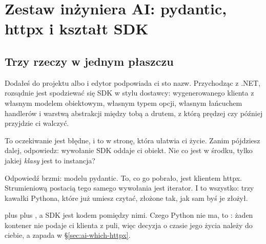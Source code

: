 
\chapter{Zestaw inżyniera AI: pydantic, httpx i kształt SDK}
\label{ch:aitoolkit}

\section{Trzy rzeczy w jednym płaszczu}
\label{sec:ai-three-things}

Dodałeś do projektu  albo  i edytor podpowiada ci
sto nazw. Przychodząc z .NET, rozsądnie jest spodziewać się SDK w stylu
dostawcy: wygenerowanego klienta z własnym modelem obiektowym, własnym typem
opcji, własnym łańcuchem handlerów i warstwą abstrakcji między tobą a
drutem, z którą prędzej czy później przyjdzie ci walczyć.

To oczekiwanie jest błędne, i to w stronę, która ułatwia ci życie. Zanim
pójdziesz dalej, odpowiedz: wywołanie SDK oddaje ci obiekt. Nie \dash{} co
jest w środku, tylko jakiej \emph{klasy} jest to instancja?

Odpowiedź brzmi: modelu pydantic. To, co go pobrało, jest klientem httpx.
Strumieniową postacią tego samego wywołania jest iterator. I to wszystko:
trzy kawałki Pythona, które już umiesz czytać, złożone tak, jak sam byś je
złożył.


\begin{csbox}
 plus  plus
, a SDK jest kodem pomiędzy nimi. Czego Python nie
ma, to : żaden kontener nie podaje ci klienta z
puli, więc decyzja o czasie jego życia należy do ciebie, a zapada w
\S\ref{sec:ai-which-httpx}.
\end{csbox}

